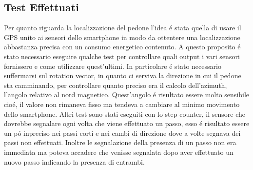 \documentclass[conference]{IEEEtran}
\begin{document}
\subsection{Test Effettuati}
Per quanto riguarda la localizzazione del pedone l'idea \'e stata quella di usare il GPS unito ai sensori dello smartphone in modo da ottentere una localizzazione abbastanza precisa con un consumo energetico contenuto. A questo proposito \'e stato necessario eseguire qualche test per controllare quali output i vari sensori fornissero e come utilizzare quest'ultimi. In particolare \'e stato necessario suffermarsi sul rotation vector, in quanto ci serviva la direzione in cui il pedone sta camminando, per controllare quanto preciso era il calcolo dell'azimuth, l'angolo relativo al nord magnetico. Quest'angolo \'e risultato essere molto sensibile cio\'e, il valore non rimaneva fisso ma tendeva a cambiare al minimo movimento dello smartphone. Altri test sono stati eseguiti con lo step counter, il sensore che dovrebbe segnalare ogni volta che viene effettuato un passo, esso \'e risultato essere un p\'o inpreciso nei passi corti e nei cambi di direzione dove a volte segnava dei passi non effettuati. Inoltre le segnalazione della presenza di un passo non era immediata ma poteva accadere che venisse segnalata dopo aver effettuato un nuovo passo indicando la presenza di entrambi. 
\end{document}
